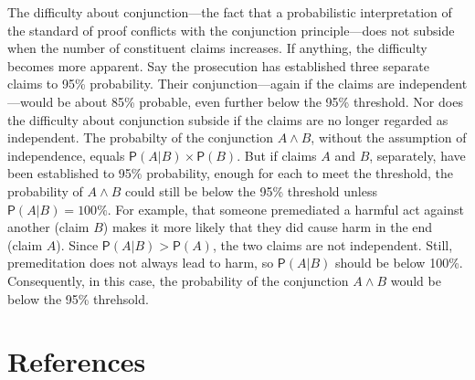 \documentclass[
  10pt,
  dvipsnames,enabledeprecatedfontcommands]{scrartcl}
\newcommand{\et}{\wedge}
\newcommand{\pr}[1]{\mathsf{P}(#1)}
\begin{document}
The difficulty about conjunction---the fact that a probabilistic
interpretation of the standard of proof conflicts with the conjunction
principle---does not subside when the number of constituent claims
increases. If anything, the difficulty becomes more apparent. Say the
prosecution has established three separate claims to 95\% probability.
Their conjunction---again if the claims are independent---would be about
85\% probable, even further below the 95\% threshold. Nor does the
difficulty about conjunction subside if the claims are no longer
regarded as independent. The probabilty of the conjunction \(A \et B\),
without the assumption of independence, equals
\(\pr{A | B} \times \pr{B}\). But if claims \(A\) and \(B\), separately,
have been established to 95\% probability, enough for each to meet the
threshold, the probability of \(A \et B\) could still be below the 95\%
threshold unless \(\pr{A | B}=100\%\). For example, that someone
premediated a harmful act against another (claim \(B\)) makes it more
likely that they did cause harm in the end (claim \(A\)). Since
\(\pr{A | B} > \pr{A}\), the two claims are not independent. Still,
premeditation does not always lead to harm, so \(\pr{A | B}\) should be
below 100\%. Consequently, in this case, the probability of the
conjunction \(A \et B\) would be below the 95\%
threhsold.

\hypertarget{references}{%
\section*{References}\label{references}}
\end{document}
